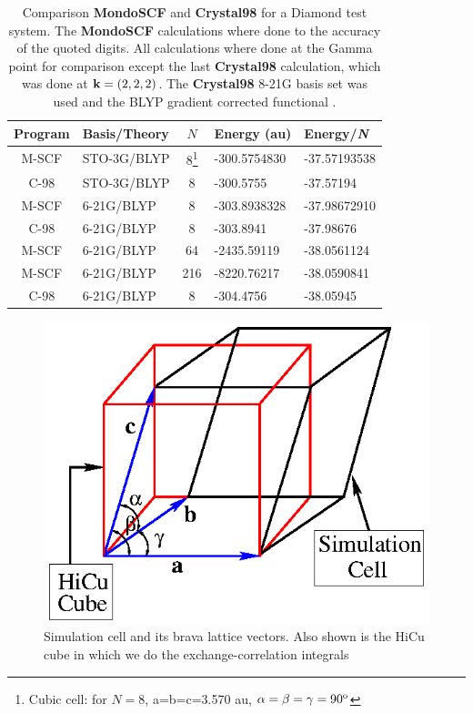\documentclass[prb,aps,nobibnotes,twocolumn,doublespace,twocolumngrid,superbib]{revtex4}
\begin{document}
\begin{table}
\caption{Comparison \textbf{MondoSCF} and \textbf{Crystal98} for a 
Diamond test system.  The \textbf{MondoSCF} calculations where done to
the accuracy of the quoted digits. All calculations where done at the Gamma point
for comparison except the last \textbf{Crystal98} calculation, which was done at ${\bf k}=(2,2,2)$.
The \textbf{Crystal98} 8-21G  basis set was used \cite{C98Basis} and the BLYP gradient corrected 
functional \cite{Becke92}.}
\label{table:ComToCrystal98_3}

\begin{tabular}{clcll}
\hline 
Program&
Basis/Theory&
\( N \)&
Energy (au)&
Energy/{\it N}\\
\hline
\hline 
M-SCF&
STO-3G/BLYP&
8\footnote[1]{Cubic cell: for $N=8$, a=b=c=3.570 au, $\alpha=\beta=\gamma=90^{{\rm o}}$}&
-300.5754830 &
-37.57193538 \\
C-98&
STO-3G/BLYP&
8\footnotemark[1]&
-300.5755 &
-37.57194 \\
M-SCF&
6-21G/BLYP&
8\footnotemark[1]&
-303.8938328 &
-37.98672910 \\
C-98&
6-21G/BLYP&
8\footnotemark[1]&
-303.8941 &
-37.98676 \\
\hline 
M-SCF&
6-21G/BLYP&
64\footnotemark[1]&
-2435.59119 &
-38.0561124\\
M-SCF&
6-21G/BLYP&
216\footnotemark[1]&
-8220.76217 &
-38.0590841 \\
\hline
\,\,C-98\,\,&
6-21G/BLYP\,\,&
\,\,8\footnotemark[1]\,\,&
-304.4756 &
-38.05945\\
\hline
\end{tabular}
\end{table}
%
%
%
\eject
%
%
%
\begin{figure}

\caption{\label{figure:SimCell} Simulation cell and its brava lattice vectors. Also
shown is the HiCu cube in which we do the exchange-correlation integrals}
{\centering \includegraphics{UnitCell_2.ps} \par}
\end{figure}
\end{document}
